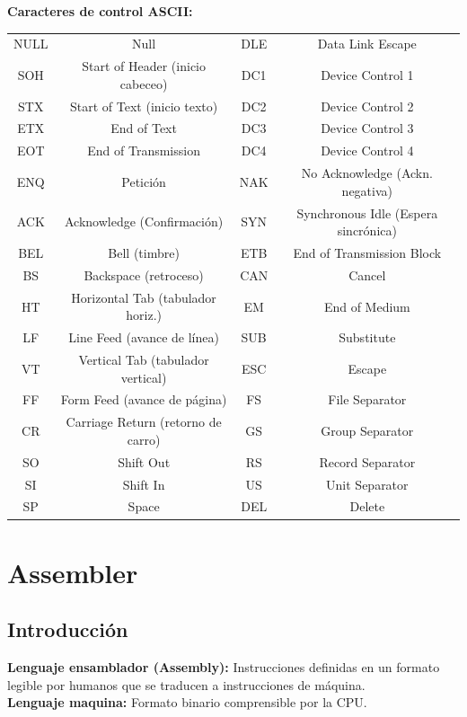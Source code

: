 \documentclass{templateNote}
\begin{document}
\textbf{Caracteres de control ASCII:}
\begin{table}[H]
    \begin{tabular}{|c|c|c|c|}
        \hline
        NULL & Null & DLE & Data Link Escape \\
        SOH & Start of Header (inicio cabeceo) & DC1 & Device Control 1 \\
        STX & Start of Text (inicio texto)& DC2 & Device Control 2 \\
        ETX & End of Text & DC3 & Device Control 3 \\
        EOT & End of Transmission & DC4 & Device Control 4 \\
        ENQ & Petición & NAK & No Acknowledge (Ackn. negativa)\\
        ACK & Acknowledge (Confirmación) & SYN & Synchronous Idle (Espera sincrónica) \\
        BEL & Bell (timbre) & ETB & End of Transmission Block \\
        BS & Backspace (retroceso) & CAN & Cancel \\
        HT & Horizontal Tab (tabulador horiz.) & EM & End of Medium \\
        LF & Line Feed (avance de línea) & SUB & Substitute \\
        VT & Vertical Tab (tabulador vertical) & ESC & Escape \\
        FF & Form Feed (avance de página) & FS & File Separator \\
        CR & Carriage Return (retorno de carro) & GS & Group Separator \\
        SO & Shift Out & RS & Record Separator \\
        SI & Shift In & US & Unit Separator \\
        SP & Space & DEL & Delete \\
        \hline
    \end{tabular}
\end{table}

\newpage
\section{Assembler}
\subsection{Introducción}
\noindent \textbf{Lenguaje ensamblador (Assembly):} Instrucciones definidas en un formato legible por humanos que se traducen a instrucciones de máquina.\\
\textbf{Lenguaje maquina:} Formato binario comprensible por la CPU.\\
\end{document}
